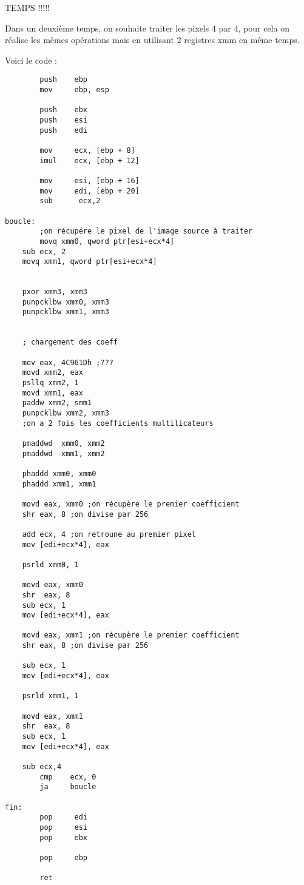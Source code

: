 \documentclass[11pt]{report}
\begin{document}
TEMPS !!!!!


Dans un deuxième temps, on souhaite traiter les pixels 4 par 4, pour cela on réalise les mêmes opérations mais en utilisant 2 registres xmm en même temps. 

Voici le code :

\begin{lstlisting}
        push    ebp
        mov     ebp, esp

        push    ebx
        push    esi
        push    edi

        mov     ecx, [ebp + 8]
        imul    ecx, [ebp + 12]

        mov     esi, [ebp + 16]
        mov     edi, [ebp + 20]
		sub      ecx,2

boucle: 
        ;on récupére le pixel de l'image source à traiter 
        movq xmm0, qword ptr[esi+ecx*4]
	sub ecx, 2
	movq xmm1, qword ptr[esi+ecx*4]
		
		
	pxor xmm3, xmm3
	punpcklbw xmm0, xmm3 
	punpcklbw xmm1, xmm3 


	; chargement des coeff
		
	mov eax, 4C961Dh ;???
	movd xmm2, eax
	psllq xmm2, 1
	movd xmm1, eax
	paddw xmm2, smm1
	punpcklbw xmm2, xmm3
	;on a 2 fois les coefficients multilicateurs

	pmaddwd  xmm0, xmm2
	pmaddwd  xmm1, xmm2

	phaddd xmm0, xmm0
	phaddd xmm1, xmm1
		
	movd eax, xmm0 ;on récupère le premier coefficient
	shr eax, 8 ;on divise par 256

	add ecx, 4 ;on retroune au premier pixel
	mov [edi+ecx*4], eax

	psrld xmm0, 1

	movd eax, xmm0
	shr  eax, 8
	sub ecx, 1
	mov [edi+ecx*4], eax

	movd eax, xmm1 ;on récupère le premier coefficient
	shr eax, 8 ;on divise par 256

	sub ecx, 1
	mov [edi+ecx*4], eax

	psrld xmm1, 1

	movd eax, xmm1
	shr  eax, 8
	sub ecx, 1
	mov [edi+ecx*4], eax

	sub	ecx,4
        cmp    ecx, 0
        ja     boucle

fin:
        pop     edi
        pop     esi
        pop     ebx

        pop     ebp

        ret       
\end{lstlisting}
\end{document}
